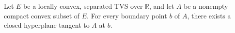 Let $E$ be a locally convex, separated TVS over $\mathbb{R}$, and let $A$ be a nonempty compact convex subset of $E$. For every boundary point $b$ of $A$, there exists a closed hyperplane tangent to $A$ at $b$.